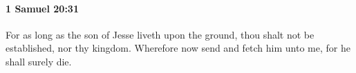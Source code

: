 
		\paragraph{1 Samuel 20:31} %
			\label{1SAMUEL-20-31}

			For as long as the son of Jesse liveth upon the ground, thou shalt not be established, nor thy kingdom. Wherefore now send and fetch him unto me, for he shall surely die.


